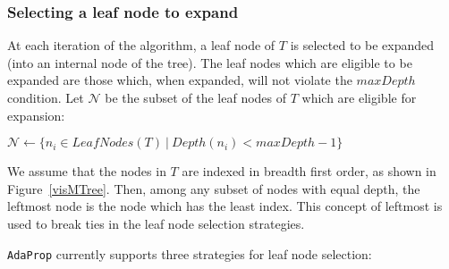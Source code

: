 \documentclass[a4paper,12pt]{article} %
\newcommand{\AdaProp}{\texttt{AdaProp}\xspace}
\newcommand{\mcl}[1]{\mathcal{#1}}
\begin{document}
\subsubsection{Selecting a leaf node to expand}
\label{secTreeBuild}

At each iteration of the algorithm, 
    a leaf node of $T$ is selected to be expanded 
    (into an internal node of the tree).
The leaf nodes which are eligible to be expanded
    are those which, when expanded, will not 
    violate the $maxDepth$ condition.
Let $\mcl{N}$ be the subset of the leaf nodes of $T$ 
    which are eligible for expansion:
\begin{algorithmic}
    \State $\mcl{N} \gets \{ n_i \in LeafNodes(T) ~\big|~ Depth(n_i) < maxDepth - 1 \} $
\end{algorithmic}
We assume that the nodes in $T$ are indexed in breadth first order, 
    as shown in Figure~\ref{visMTree}.
Then, among any subset of nodes with equal depth,
    the leftmost node is the node which has the least index.
This concept of leftmost is used to break ties in the 
    leaf node selection strategies.    
    
\AdaProp currently supports three strategies for leaf node selection:
\end{document}
